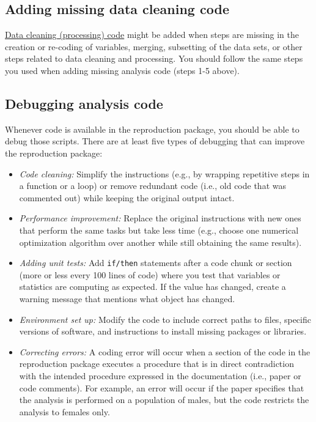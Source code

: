 \documentclass[
  openany]{book}
\providecommand{\tightlist}{%
  \setlength{\itemsep}{0pt}\setlength{\parskip}{0pt}}
\begin{document}
\hypertarget{cc}{%
\subsection{Adding missing data cleaning code}\label{cc}}

\protect\hyperlink{describe-inputs}{Data cleaning (processing) code} might be added when steps are missing in the creation or re-coding of variables, merging, subsetting of the data sets, or other steps related to data cleaning and processing. You should follow the same steps you used when adding missing analysis code (steps 1-5 above).

\hypertarget{dac}{%
\subsection{Debugging analysis code}\label{dac}}

Whenever code is available in the reproduction package, you should be able to debug those scripts. There are at least five types of debugging that can improve the reproduction package:

\begin{itemize}
\tightlist
\item
  \emph{Code cleaning:} Simplify the instructions (e.g., by wrapping repetitive steps in a function or a loop) or remove redundant code (i.e., old code that was commented out) while keeping the original output intact.\\
\item
  \emph{Performance improvement:} Replace the original instructions with new ones that perform the same tasks but take less time (e.g., choose one numerical optimization algorithm over another while still obtaining the same results).
\item
  \emph{Adding unit tests:} Add \texttt{if/then} statements after a code chunk or section (more or less every 100 lines of code) where you test that variables or statistics are computing as expected. If the value has changed, create a warning message that mentions what object has changed.\\
\item
  \emph{Environment set up:} Modify the code to include correct paths to files, specific versions of software, and instructions to install missing packages or libraries.\\
\item
  \emph{Correcting errors:} A coding error will occur when a section of the code in the reproduction package executes a procedure that is in direct contradiction with the intended procedure expressed in the documentation (i.e., paper or code comments). For example, an error will occur if the paper specifies that the analysis is performed on a population of males, but the code restricts the analysis to females only.
\end{itemize}
\end{document}
